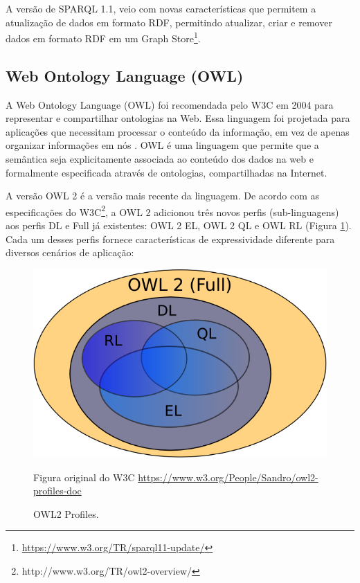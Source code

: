 %
A versão de SPARQL 1.1, veio com novas características que permitem
a atualização de dados em formato \foreignlanguage{english}{RDF},
permitindo atualizar, criar e remover dados em formato \foreignlanguage{english}{RDF}
em um \foreignlanguage{english}{Graph Store}\footnote{\url{https://www.w3.org/TR/sparql11-update/}}.
%

\subsection*{Web Ontology Language\foreignlanguage{brazil}{ (}OWL\foreignlanguage{brazil}{)}}

%
A \foreignlanguage{english}{Web Ontology Language} (\foreignlanguage{english}{OWL})
foi recomendada pelo W3C em 2004 para representar e compartilhar ontologias
na Web. Essa linguagem foi projetada para aplicações que necessitam
processar o conteúdo da informação, em vez de apenas organizar informações
em nós \citep{mcguinness2004owl}. \foreignlanguage{english}{OWL}
é uma linguagem que permite que a semântica seja explicitamente associada
ao conteúdo dos dados na web e formalmente especificada através de
ontologias, compartilhadas na Internet. 

A versão \foreignlanguage{english}{OWL} 2 é a versão mais recente
da linguagem. De acordo com as especificações do W3C\footnote{http://www.w3.org/TR/owl2-overview/},
a \foreignlanguage{english}{OWL 2} adicionou três novos perfis (\foreignlanguage{english}{sub-linguagens})
aos perfis DL e \foreignlanguage{english}{Full} já existentes: \foreignlanguage{english}{OWL
2} EL,\foreignlanguage{english}{ OWL 2 QL} e \foreignlanguage{english}{OWL
RL} (Figura \ref{fig:OWL2-Profiles}). Cada um desses perfis fornece
características de expressividade diferente para diversos cenários
de aplicação:

\begin{figure}[H]
\begin{centering}
\includegraphics[width=0.6\columnwidth]{figures/owl2Profiles}
\par\end{centering}
\caption{OWL2 Profiles.\label{fig:OWL2-Profiles}}

Figura original do W3C \url{https://www.w3.org/People/Sandro/owl2-profiles-doc}
\end{figure}
 
